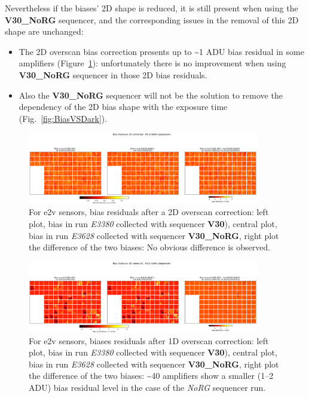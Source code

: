 Nevertheless if the biases' 2D shape is reduced, it is still present when using the {\bf V30\_NoRG} sequencer, and the corresponding issues in the removal of this 2D shape are unchanged: 
\begin{itemize}
\item The 2D overscan bias correction  presents  up to \textasciitilde1 ADU bias residual in some amplifiers (Figure~\ref{fig:2DNoRGEffect}): unfortunately there is no improvement when using  {\bf V30\_NoRG} sequencer in those 2D bias residuals. 
\item Also the {\bf V30\_NoRG} sequencer will not be the solution to remove the dependency of the 2D bias shape with the exposure time (Fig.~\ref{fig:BiasVSDark}).
\end{itemize}

\begin{figure}[ht]
\begin{centering}
\includegraphics[width=0.9\textwidth]{figures/Bias_PA_2D_raw_RG_NoRG_2024113000334_2024120200302.png}
\end{centering}
\caption{For e2v sensors, bias residuals after a 2D overscan correction: left plot, bias in run {\it E3380} collected  with sequencer {\bf V30}), central plot, bias in run {\it E3628} collected with sequencer {\bf V30\_NoRG}, right plot the difference of the two biases:  No obvious difference is observed.}\label{fig:2DNoRGEffect}
\end{figure}

\begin{figure}[ht]
\begin{centering}
\includegraphics[width=0.9\textwidth]{figures/Bias_PA_1D_raw_RG_NoRG_2024113000334_2024120200302.png}
\end{centering}
\caption{For e2v sensors, biases residuals after 1D overscan correction: left plot, bias in run {\it E3380} collected  with sequencer {\bf V30}), central plot, bias in run {\it E3628} collected with sequencer {\bf V30\_NoRG}, right plot the difference of the two biases: \textasciitilde40 amplifiers show a smaller (1--2 ADU)  bias residual level in  the case of the {\it NoRG} sequencer run. }\label{fig:1DNoRGEffect}
\end{figure}

